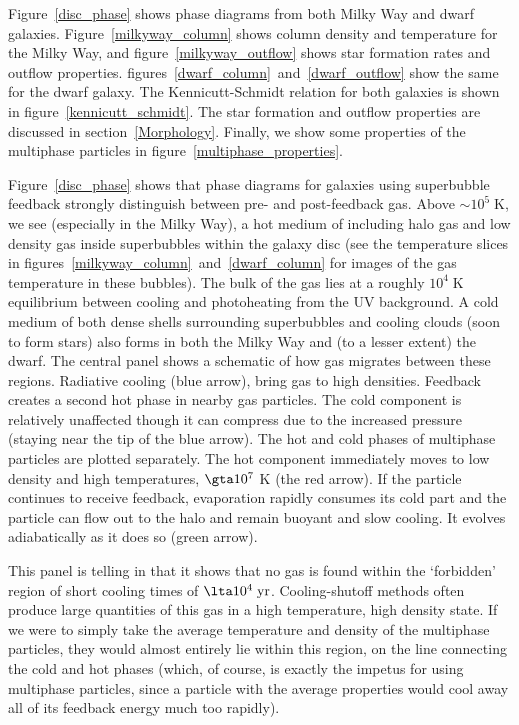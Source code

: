 Figure~\ref{disc_phase} shows phase diagrams from both Milky Way and dwarf
galaxies.  Figure~\ref{milkyway_column} shows column density and temperature for
the Milky Way, and figure~\ref{milkyway_outflow} shows star formation rates and
outflow properties.  figures~\ref{dwarf_column}~and~\ref{dwarf_outflow} show the
same for the dwarf galaxy.  The Kennicutt-Schmidt relation for both galaxies is
shown in figure~\ref{kennicutt_schmidt}.  The star formation and outflow properties are
discussed in section~\ref{Morphology}.  Finally, we show some properties of the
multiphase particles in figure~\ref{multiphase_properties}.

Figure~\ref{disc_phase} shows that phase diagrams for galaxies using superbubble
feedback strongly distinguish between pre- and post-feedback gas.  Above $\sim
10^5\;\mathrm{K}$, we see (especially in the Milky Way), a hot medium of
including halo gas and low density gas inside superbubbles within the galaxy
disc (see the temperature slices in
figures~\ref{milkyway_column}~and~\ref{dwarf_column} for images of the gas
temperature in these bubbles).  The bulk of the gas lies at a roughly $10^4\;
\mathrm{K}$ equilibrium between cooling and photoheating from the UV background.
A cold medium of both dense shells surrounding superbubbles and cooling clouds
(soon to form stars) also forms in both the Milky Way and (to a lesser extent)
the dwarf.  The central panel shows a schematic of how gas migrates between
these regions.  Radiative cooling (blue arrow), bring gas to high densities.
Feedback creates a second hot phase in nearby gas particles.  The cold component
is relatively unaffected though it can compress due to the increased pressure
(staying near the tip of the blue arrow).  The hot and cold phases of multiphase
particles are plotted separately.  The hot component immediately moves to low
density and high temperatures,  $\gta 10^7$ K (the red arrow).  If the particle
continues to receive feedback, evaporation rapidly consumes its cold part and
the particle can flow out to the halo and remain buoyant and slow cooling.  It
evolves adiabatically as it does so (green arrow).

This panel is telling in that it shows that no gas is found within the
`forbidden' region of short cooling times of $\lta 10^4\;\mathrm{yr}$.
Cooling-shutoff methods often produce large quantities of this gas in a high
temperature, high density state.  If we were to simply take the average
temperature and density of the multiphase particles, they would almost entirely
lie within this region, on the line connecting the cold and hot phases (which,
of course, is exactly the impetus for using multiphase particles, since a
particle with the average properties would cool away all of its feedback energy
much too rapidly).

